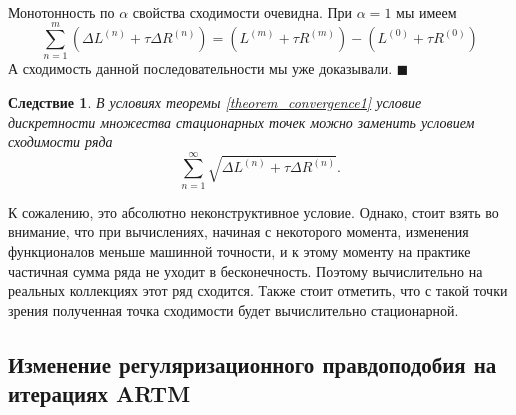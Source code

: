 \documentclass[12pt]{article}
\newtheorem{conseq}{Следствие}[theorem]
\newenvironment{Proof} 
	{\par\noindent{\bf Доказательство.}} 
	{\hfill$\blacksquare$}
\begin{document}
\begin{Proof}\ \\
Монотонность по $\alpha$ свойства сходимости очевидна. При $\alpha=1$ мы имеем
\[
\sum\limits_{n=1}^{m} (\Delta L^{(n)} + \tau \Delta R^{(n)}) = ( L^{(m)} + \tau R^{(m)}) - ( L^{(0)} + \tau R^{(0)})
\]
А сходимость данной последовательности мы уже доказывали.
\end{Proof}\ \\
\begin{conseq}
В условиях теоремы  \ref{theorem_convergence1} условие дискретности множества стационарных точек можно заменить условием сходимости ряда
\[
\sum\limits_{n=1}^{\infty} \sqrt{\Delta L^{(n)} + \tau \Delta R^{(n)}}.
\]
\end{conseq}
К сожалению, это абсолютно неконструктивное условие. Однако, стоит взять во внимание, что при вычислениях, начиная с некоторого момента, изменения функционалов меньше машинной точности, и к этому моменту на практике частичная сумма ряда не уходит в бесконечность. Поэтому вычислительно на реальных коллекциях этот ряд сходится. Также стоит отметить, что с такой точки зрения полученная точка  сходимости будет вычислительно стационарной.
	\subsection{Изменение регуляризационного правдоподобия на итерациях ARTM}
\end{document}
